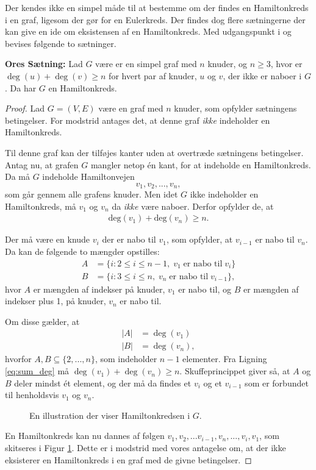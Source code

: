 Der kendes ikke en simpel måde til at bestemme om der findes en Hamiltonkreds i en graf, ligesom der gør for en Eulerkreds. 
Der findes dog flere sætningerne der kan give en ide om eksistensen af en Hamiltonkreds. Med udgangspunkt i \citep{wilson_graph} og \citep{orebevis} bevises følgende to sætninger.

\begin{thm} \label{ores_thm}
	\textbf{Ores Sætning:} 
	Lad $G$ være er en simpel graf med $n$ knuder, og $n\geq3$, hvor er $\deg(u)+\deg(v)\geq n$ for hvert par af knuder, $u$ og $v$, der ikke er naboer i $G$. 
	Da har $G$ en Hamiltonkreds. 
\end{thm}

\begin{proof}
	Lad $G=(V,E)$ være en graf med $n$ knuder, som opfylder sætningens betingelser. For modstrid antages det, at denne graf \textit{ikke} indeholder en Hamiltonkreds.

	Til denne graf kan der tilføjes kanter uden at overtræde sætningens betingelser. Antag nu, at grafen $G$ mangler netop én kant, for at indeholde en Hamiltonkreds. 
	Da må $G$ indeholde Hamiltonvejen 
	$$v_1, v_2,...,v_n,$$
	som går gennem alle grafens knuder. 
	Men idet $G$ ikke indeholder en Hamiltonkreds, må $v_1$ og $v_n$ da \textit{ikke} være naboer.
	Derfor opfylder de, at
	\begin{align} \label{eq:sum_deg}
		\textrm{deg}(v_1)+\textrm{deg}(v_n)\geq n.
	\end{align}

	Der må være en knude $v_i$ der er nabo til $v_1$, som opfylder, at $v_{i-1}$ er nabo til $v_n$.
	Da kan de følgende to mængder opstilles:
	\begin{align*}
		A &= \lbrace i: 2 \leq i \leq n-1, \; v_1 \; \textrm{er nabo til} \; v_i \rbrace \\
		B &= \lbrace i: 3 \leq i \leq n, \; v_n \; \textrm{er nabo til} \; v_{i-1} \rbrace,
	\end{align*}
	hvor $A$ er mængden af indekser på knuder, $v_1$ er nabo til, og $B$ er mængden af indekser plus 1, på knuder, $v_n$ er nabo til. 

	Om disse gælder, at
	\begin{align*}
		|A| &= \deg(v_1) \\
		|B| &= \deg(v_n),
	\end{align*}
	hvorfor $A,B \subseteq \lbrace 2,...,n \rbrace$, som indeholder $n-1$ elementer.
	Fra Ligning \eqref{eq:sum_deg} må $\deg(v_1) + \deg(v_n) \geq n$.
	Skuffeprincippet giver så, at $A$ og $B$ deler mindst ét element, og der må da findes et $v_i$ og et $v_{i-1}$ som er forbundet til henholdsvis $v_1$ og $v_n$.

	\begin{figure}[h!]
		\centering
		
		\caption{En illustration der viser Hamiltonkredsen i $G$.} \label{ore_bevis}
	\end{figure}
	
	En Hamiltonkreds kan nu dannes af følgen $v_1, v_2,...v_{i-1},v_n,...,v_i,v_1$,
	som skitseres i Figur \ref{ore_bevis}. Dette er i modstrid med vores antagelse om, at der ikke eksisterer en Hamiltonkreds i en graf med de givne betingelser.	
\end{proof}

